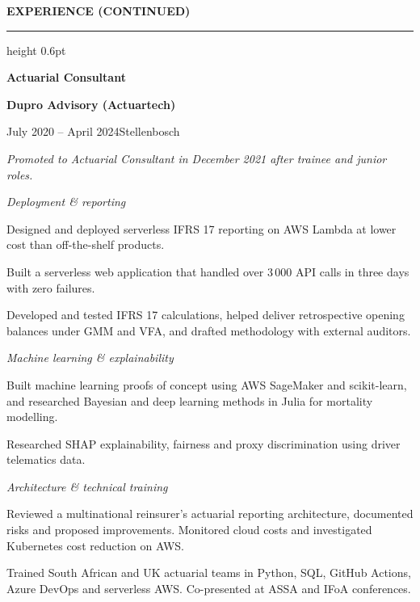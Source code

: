 \documentclass[10pt,a4paper,ragged2e,withhyper]{altacv}
\renewcommand{\cvsection}[1]{%
  \par\addvspace{0.8em}%
  {\normalsize\bfseries\color{heading}\MakeUppercase{#1}\par}%
  \nobreak\vspace{0.2em}%
  {\color{headingrule}\hrule height 0.6pt}%
  \nobreak\vspace{0.6em}%
}
\newcommand{\experiencegroup}[1]{%
  \par\addvspace{0.8em}%
  {\normalsize\mdseries\itshape\color{PrimaryColor}#1\par}%
  \nobreak\vspace{0.4em}%
}
\newenvironment{cvmain}{%
  \begin{minipage}[t]{0.675\textwidth}%
  \vspace{0pt}%
  \RaggedRight\fontsize{11}{14.5}\selectfont
}{%
  \end{minipage}%
}
\renewcommand{\cvevent}[4]{%
  {\large\bfseries\color{emphasis}#1\par}%
  {\small\bfseries\color{accent}#2\par}%
  \vspace{0.15em}%
  {\small #3\enspace\textbar\enspace #4\par}%
  \vspace{0.35em}%
}
\begin{document}
\begin{cvmain}
\cvsection{Experience (continued)}
\cvevent{Actuarial Consultant}{Dupro Advisory (Actuartech)}{July 2020 -- April 2024}{Stellenbosch}
{\small\textit{Promoted to Actuarial Consultant in December 2021 after trainee and junior roles.}\par}

\experiencegroup{Deployment \& reporting}
\begin{cvitems}
  \item Designed and deployed serverless IFRS 17 reporting on AWS Lambda at lower cost than off-the-shelf products.
  \item Built a serverless web application that handled over 3\,000 API calls in three days with zero failures.
  \item Developed and tested IFRS 17 calculations, helped deliver retrospective opening balances under GMM and VFA, and drafted methodology with external auditors.
\end{cvitems}

\experiencegroup{Machine learning \& explainability}
\begin{cvitems}
  \item Built machine learning proofs of concept using AWS SageMaker and scikit-learn, and researched Bayesian and deep learning methods in Julia for mortality modelling.
  \item Researched SHAP explainability, fairness and proxy discrimination using driver telematics data.
\end{cvitems}

\experiencegroup{Architecture \& technical training}
\begin{cvitems}
  \item Reviewed a multinational reinsurer's actuarial reporting architecture, documented risks and proposed improvements. Monitored cloud costs and investigated Kubernetes cost reduction on AWS.
  \item Trained South African and UK actuarial teams in Python, SQL, GitHub Actions, Azure DevOps and serverless AWS. Co-presented at ASSA and IFoA conferences.
\end{cvitems}


\end{cvmain}
\end{document}
